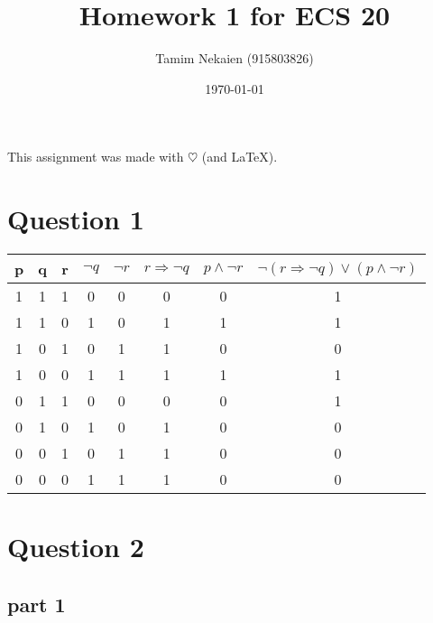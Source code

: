 \documentclass[a4paper,12pt]{article}
\begin{document}
\title{Homework 1 for ECS 20}
\author{Tamim Nekaien (915803826)}
\date{\today}
\maketitle

This assignment was made with 
$\heartsuit$ (and \LaTeX).

\tableofcontents
\newpage
 
\section{Question 1}
\label{sec1}

\begin{center}
  \begin{tabular}{ |c|c|c|c|c|c|c|c| }
    \hline
    p & q & r & $ \neg q$ & $\neg r$ & $r \Rightarrow \neg q$ & $p \wedge \neg r$ & $\neg(r \Rightarrow \neg q) \vee (p \wedge \neg r)$  \\ \hline
    1 & 1 & 1 & 0 & 0 & 0 & 0 & 1 \\ \hline
    1 & 1 & 0 & 1 & 0 & 1 & 1 & 1 \\ \hline
    1 & 0 & 1 & 0 & 1 & 1 & 0 & 0 \\ \hline
    1 & 0 & 0 & 1 & 1 & 1 & 1 & 1 \\ \hline
    0 & 1 & 1 & 0 & 0 & 0 & 0 & 1 \\ \hline
    0 & 1 & 0 & 1 & 0 & 1 & 0 & 0 \\ \hline
    0 & 0 & 1 & 0 & 1 & 1 & 0 & 0 \\ \hline
    0 & 0 & 0 & 1 & 1 & 1 & 0 & 0 \\ 
    \hline
  \end{tabular}
\end{center}


\section{Question 2}
\label{sec2}

\subsection{part 1}
\label{sec3}
\end{document}
